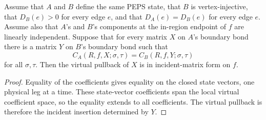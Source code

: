 \begin{theorem}
    \label{thm:peps_region_coeff_transfer_to_reconcile}
    \leanok
    Assume that \(A\) and \(B\) define the same PEPS state, that \(B\) is
    vertex-injective, that \(D_B(e)>0\) for every edge \(e\), and that
    \(D_A(e)=D_B(e)\) for every edge \(e\).  Assume also that \(A\)'s and \(B\)'s
    components at the in-region endpoint of \(f\) are linearly independent.
    Suppose that for
    every matrix \(X\) on \(A\)'s boundary bond there is a matrix \(Y\) on \(B\)'s
    boundary bond such that
    \[
        C_A(R,f,X;\sigma,\tau)=C_B(R,f,Y;\sigma,\tau)
    \]
    for all \(\sigma,\tau\).  Then the virtual pullback of \(X\) is in
    incident-matrix form on \(f\).
\end{theorem}
\begin{proof}\leanok
    Equality of the coefficients gives equality on the closed state vectors, one
    physical leg at a time.  These state-vector coefficients span the local
    virtual coefficient space, so the equality extends to all coefficients.  The
    virtual pullback is therefore the incident insertion determined by \(Y\).
\end{proof}

